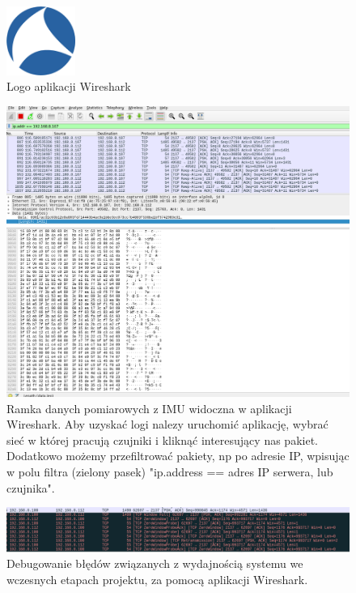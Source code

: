 \documentclass[12pt,oneside,a4paper]{book}
\theoremstyle{break}
\begin{document}
\begin{figure}[H]
    \begin{center}
        \includegraphics[width=0.2\textwidth]{wiresharklogo}
        \caption{Logo aplikacji Wireshark}
        \label{rys:uc-wiresharklogo}
    \end{center}
\end{figure}

\begin{figure}[H]
    \begin{center}
        \includegraphics[width=1\textwidth]{wireshark1}
        \caption{Ramka danych pomiarowych z IMU widoczna w aplikacji Wireshark.
        Aby uzyskać logi nalezy uruchomić aplikację, wybrać sieć w której pracują czujniki i kliknąć 
        interesujący nas pakiet. Dodatkowo możemy przefiltrować pakiety, np po adresie IP, wpisując
        w polu filtra (zielony pasek) "ip.address == adres IP serwera, lub czujnika".}
        \label{rys:uc-wireshark1}
    \end{center}
\end{figure}

\begin{figure}[H]
    \begin{center}
        \includegraphics[width=1\textwidth]{wireshark2}
        \caption{Debugowanie błędów związanych z wydajnością systemu 
        we wczesnych etapach projektu, za pomocą aplikacji Wireshark.}
        \label{rys:uc-wireshark2}
    \end{center}
\end{figure}
\end{document}
